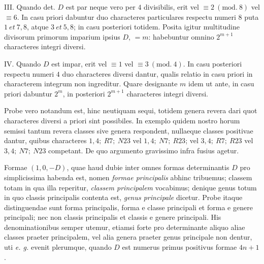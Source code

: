 III. Quando det. $D$ est par neque vero per $4$ divisibilis, erit vel $\equiv2\ (\mathrm{mod.}\ 8)$ vel $\equiv6$. In casu priori dabuntur duo characteres particulares respectu numeri $8$ puta $1\ \mathit{et}\ 7,8$, atque $3\ \mathit{et}\ 5,8$; in casu posteriori totidem. Posita igitur multitudine divisorum primorum imparium ipsius $D$, $=m$: habebuntur omnino $2^{m+1}$ characteres integri diversi.

IV. Quando $D$ est impar, erit vel $\equiv1$ vel $\equiv3\ (\mathrm{mod.}\ 4)$. In casu posteriori respectu numeri $4$ duo characteres diversi dantur, qualis relatio in casu priori in characterem integrum non ingreditur. Quare designante $m$ idem ut ante, in casu priori dabuntur $2^m$, in posteriori $2^{m+1}$ characteres integri diversi.

Probe vero notandum est, hinc neutiquam sequi, totidem genera revera
dari quot characteres diversi a priori sint possibiles. In exemplo quidem nostro horum semissi tantum revera classes sive genera respondent, nullaeque classes positivae dantur, quibus characteres $1,4;\ R7;\ N23$ vel $1,4;\ N7;\ R23$; vel $3,4;\ R7;\ R23$ vel $3,4;\ N7;\ N23$ competant. De quo argumento gravissimo infra fusius agetur.

Formae $(1,0,-D)$, quae haud dubie inter omnes formas determinantis $D$ pro simplicissima habenda est, nomen \textit{formae principalis} abhinc tribuemus; classem totam in qua illa reperitur, \textit{classem principalem} vocabimus; denique genus totum in quo classis principalis contenta est, \textit{genus principale} dicetur. Probe itaque distinguendae sunt forma principalis, forma e classe principali et forma e genere principali; nec non classis principalis et classis e genere principali. His denominationibus semper utemur, etiamsi forte pro determinante aliquo aliae classes praeter principalem, vel alia genera praeter genus principale non dentur, uti \textit{e. g.} evenit plerumque, quando $D$ est numerus primus positivus formae $4n+1$.

